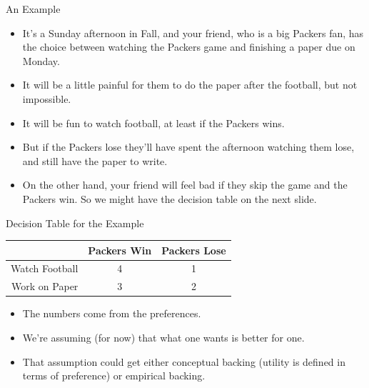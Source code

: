 \documentclass[
  ignorenonframetext,
]{beamer}
\providecommand{\tightlist}{%
  \setlength{\itemsep}{0pt}\setlength{\parskip}{0pt}}
\renewcommand{\,}{\text{, }}
\begin{document}
\begin{frame}{An Example}
\protect\hypertarget{an-example-2}{}

\begin{itemize}
\tightlist
\item
  It's a Sunday afternoon in Fall, and your friend, who is a big Packers
  fan, has the choice between watching the Packers game and finishing a
  paper due on Monday.
\item
  It will be a little painful for them to do the paper after the
  football, but not impossible.
\item
  It will be fun to watch football, at least if the Packers wins.
\item
  But if the Packers lose they'll have spent the afternoon watching them
  lose, and still have the paper to write.
\item
  On the other hand, your friend will feel bad if they skip the game and
  the Packers win. So we might have the decision table on the next
  slide.
\end{itemize}

\end{frame}

\begin{frame}{Decision Table for the Example}
\protect\hypertarget{decision-table-for-the-example}{}

\begin{longtable}[]{@{}rcc@{}}
\toprule
& Packers Win & Packers Lose\tabularnewline
\midrule
\endhead
Watch Football & 4 & 1\tabularnewline
Work on Paper & 3 & 2\tabularnewline
\bottomrule
\end{longtable}

\begin{itemize}
\tightlist
\item
  The numbers come from the preferences.
\item
  We're assuming (for now) that what one wants is better for one.
\item
  That assumption could get either conceptual backing (utility is
  defined in terms of preference) or empirical backing.
\end{itemize}

\end{frame}
\end{document}
